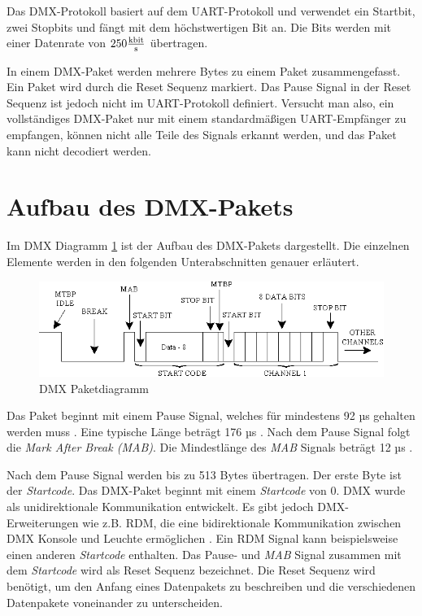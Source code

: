 Das DMX-Protokoll basiert auf dem UART-Protokoll und verwendet ein Startbit, zwei Stopbits und fängt mit dem höchstwertigen Bit an. Die Bits werden mit einer Datenrate von $250 \frac{\SI{}{\kilo\bit}}{\SI{}{\s}}$ übertragen\cite[S.10]{DMX512-Protocol-Standard}.

In einem DMX-Paket werden mehrere Bytes zu einem Paket zusammengefasst. Ein Paket wird durch die Reset Sequenz markiert. Das Pause Signal in der Reset Sequenz ist jedoch nicht im UART-Protokoll definiert. Versucht man also, ein vollständiges DMX-Paket nur mit einem standardmäßigen UART-Empfänger zu empfangen, können nicht alle Teile des Signals erkannt werden, und das Paket kann nicht decodiert werden\cite[S.29]{RaspberryPiDmxInterface}.

\section{Aufbau des DMX-Pakets}

Im DMX Diagramm \ref{fig:DmxPacketDiagram} ist der Aufbau des DMX-Pakets dargestellt. Die einzelnen Elemente werden in den folgenden Unterabschnitten genauer erläutert.

\begin{figure}[H]
	\centering
	\includegraphics[width=0.8\linewidth]{Pictures/DmxTiming}
	\caption{DMX Paketdiagramm \cite[S.107]{DmxBiDerectionRdmDMX}}
	\label{fig:DmxPacketDiagram}
\end{figure}

Das Paket beginnt mit einem Pause Signal, welches für mindestens 92 µs gehalten werden muss \cite[S.18]{DMX512-Protocol-Standard}. Eine typische Länge beträgt 176 µs \cite[S.18]{DMX512-Protocol-Standard}. Nach dem Pause Signal folgt die \emph{Mark After Break (MAB)}. Die Mindestlänge des \emph{MAB} Signals beträgt 12 µs \cite[p.18]{DMX512-Protocol-Standard}.

Nach dem Pause Signal werden bis zu 513 Bytes übertragen. Der erste Byte ist der \emph{Startcode}. Das DMX-Paket beginnt mit einem \emph{Startcode} von 0. DMX wurde als unidirektionale Kommunikation entwickelt. Es gibt jedoch DMX-Erweiterungen wie z.B. RDM, die eine bidirektionale Kommunikation zwischen DMX Konsole und Leuchte ermöglichen \cite[p.23]{DMX512-Protocol-Standard}. Ein RDM Signal kann beispielsweise einen anderen \emph{Startcode} enthalten. Das Pause- und \emph{MAB} Signal zusammen mit dem \emph{Startcode} wird als Reset Sequenz bezeichnet. Die  Reset Sequenz wird benötigt, um den Anfang eines Datenpakets zu beschreiben und die verschiedenen Datenpakete voneinander zu unterscheiden.

